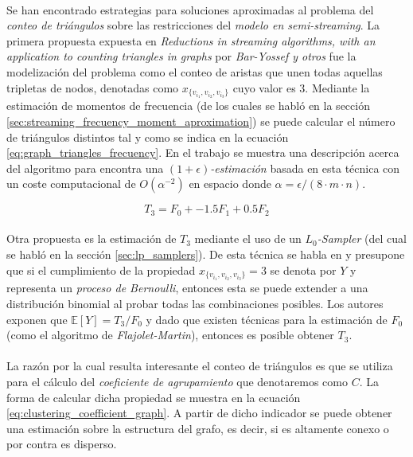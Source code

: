 \documentclass{subfiles}
\begin{document}
        \paragraph{}
        Se han encontrado estrategias para soluciones aproximadas al problema del \emph{conteo de triángulos} sobre las restricciones del \emph{modelo en semi-streaming}. La primera propuesta expuesta en \emph{Reductions in streaming algorithms, with an application to counting triangles in graphs} \cite{bar2002reductions} por \emph{Bar-Yossef y otros} fue la modelización del problema como el conteo de aristas que unen todas aquellas tripletas de nodos, denotadas como $x_{\{v_{i_1},v_{i_2},v_{i_3}\}}$ cuyo valor es $3$. Mediante la estimación de momentos de frecuencia (de los cuales se habló en la sección \ref{sec:streaming_frecuency_moment_aproximation}) se puede calcular el número de triángulos distintos tal y como se indica en la ecuación \ref{eq:graph_triangles_frecuency}. En el trabajo \cite{bar2002reductions} se muestra una descripción acerca del algoritmo para encontra una \emph{$(1 + \epsilon)$-estimación} basada en esta técnica con un coste computacional de $O(\alpha^{-2})$ en espacio donde $\alpha = \epsilon / (8 \cdot m \cdot n)$.

        \begin{equation}
        \label{eq:graph_triangles_frecuency}
          T_3 = F_0 + -1.5F_1 + 0.5 F_2
        \end{equation}

        \paragraph{}
        Otra propuesta es la estimación de $T_3$ mediante el uso de un \emph{$L_0$-Sampler} (del cual se habló en la sección \ref{sec:lp_samplers}). De esta técnica se habla en \cite{ahn2012graph} y presupone que si el cumplimiento de la propiedad $x_{\{v_{i_1},v_{i_2},v_{i_3}\}} = 3$ se denota por $Y$ y representa un \emph{proceso de Bernoulli}, entonces esta se puede extender a una distribución binomial al probar todas las combinaciones posibles. Los autores exponen que $\mathbb{E}[Y] = T_3/F_0$ y dado que existen técnicas para la estimación de $F_0$ (como el algoritmo de \emph{Flajolet-Martin}), entonces es posible obtener $T_3$.

        \paragraph{}
        La razón por la cual resulta interesante el conteo de triángulos es que se utiliza para el cálculo del \emph{coeficiente de agrupamiento} que denotaremos como $C$. La forma de calcular dicha propiedad se muestra en la ecuación \eqref{eq:clustering_coefficient_graph}. A partir de dicho indicador se puede obtener una estimación sobre la estructura del grafo, es decir, si es altamente conexo o por contra es disperso.
\end{document}

